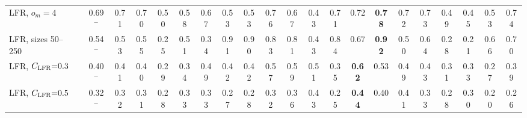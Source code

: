 \begin{table}[p]
{\begin{tabular}{llcccc|cc|cccccc|cccccccc}
LFR, $o_m{=}4$ &  & 0.69$^{-}$ & 0.71 & 0.70 & 0.50 & 0.58 & 0.67 & 0.53 & 0.53 & 0.76 & 0.67 & 0.43 & 0.71 & 0.72 & \textbf{0.78} & 0.72 & 0.73 & 0.49 & 0.45 & 0.53 & 0.74 \\
LFR, sizes 50--250 &  & 0.54$^{-}$ & 0.53 & 0.55 & 0.25 & 0.51 & 0.34 & 0.91 & 0.90 & 0.83 & 0.81 & 0.43 & 0.84 & 0.67 & \textbf{0.92} & 0.50 & 0.64 & 0.28 & 0.21 & 0.66 & 0.70 \\
LFR, $C_{\rm LFR}{=}0.3$ &  & 0.40$^{-}$ & 0.41 & 0.40 & 0.29 & 0.34 & 0.49 & 0.42 & 0.42 & 0.57 & 0.59 & 0.51 & 0.35 & \textbf{0.62} & 0.53 & 0.49 & 0.43 & 0.31 & 0.33 & 0.27 & 0.39 \\
LFR, $C_{\rm LFR}{=}0.5$ &  & 0.32$^{-}$ & 0.32 & 0.31 & 0.28 & 0.33 & 0.33 & 0.27 & 0.28 & 0.32 & 0.36 & 0.43 & 0.25 & \textbf{0.44} & 0.40 & 0.41 & 0.33 & 0.28 & 0.30 & 0.20 & 0.26 \\
\hline\hline
\end{tabular}}
\end{table}

